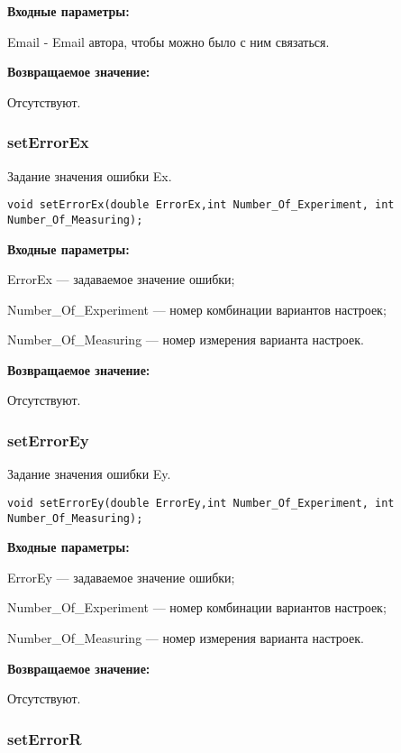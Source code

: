 \documentclass[a4paper,12pt]{article}
\begin{document}
\textbf{Входные параметры:}

Email - Email автора, чтобы можно было с ним связаться.

\textbf{Возвращаемое значение:}

Отсутствуют.


\subsubsection{setErrorEx}\label{setErrorEx}

Задание значения ошибки Ex.


\begin{lstlisting}[label=code_syntax_setErrorEx,caption=Синтаксис]
void setErrorEx(double ErrorEx,int Number_Of_Experiment, int Number_Of_Measuring);
\end{lstlisting}

\textbf{Входные параметры:}

ErrorEx --- задаваемое значение ошибки;

Number\_Of\_Experiment --- номер комбинации вариантов настроек;

Number\_Of\_Measuring --- номер измерения варианта настроек.

\textbf{Возвращаемое значение:}

Отсутствуют.


\subsubsection{setErrorEy}\label{setErrorEy}

Задание значения ошибки Ey.


\begin{lstlisting}[label=code_syntax_setErrorEy,caption=Синтаксис]
void setErrorEy(double ErrorEy,int Number_Of_Experiment, int Number_Of_Measuring);
\end{lstlisting}

\textbf{Входные параметры:}

ErrorEy --- задаваемое значение ошибки;

Number\_Of\_Experiment --- номер комбинации вариантов настроек;

Number\_Of\_Measuring --- номер измерения варианта настроек.

\textbf{Возвращаемое значение:}

Отсутствуют.


\subsubsection{setErrorR}\label{setErrorR}
\end{document}
